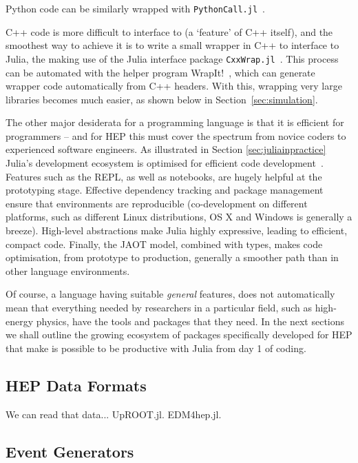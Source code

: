 \documentclass{webofc}
\begin{document}
Python code can be similarly wrapped with
\texttt{PythonCall.jl}~\cite{PythonCall.jl}.

C++ code is more difficult to interface to (a `feature' of C++ itself), and the
smoothest way to achieve it is to write a small wrapper in C++ to interface to
Julia, the making use of the Julia interface package
\texttt{CxxWrap.jl}~\cite{CxxWrap.jl}. This process can be automated with the
helper program WrapIt!~\cite{wrapit-github}, which can generate wrapper code
automatically from C++ headers. With this, wrapping very large libraries becomes
much easier, as shown below in Section~\ref{sec:simulation}.

The other major desiderata for a programming language is that it is efficient
for programmers -- and for HEP this must cover the spectrum from novice coders
to experienced software engineers. As illustrated in Section
\ref{sec:juliainpractice} Julia's development ecosystem is optimised for
efficient code development~\cite{perkel-julia-science}. Features such as the
REPL, as well as notebooks, are hugely helpful at the prototyping stage.
Effective dependency tracking and package management ensure that environments
are reproducible (co-development on different platforms, such as different Linux
distributions, OS X and Windows is generally a breeze). High-level abstractions
make Julia highly expressive, leading to efficient, compact code. Finally, the
JAOT model, combined with types, makes code optimisation, from prototype to
production, generally a smoother path than in other language environments.

Of course, a language having suitable \emph{general} features, does not
automatically mean that everything needed by researchers in a particular field,
such as high-energy physics, have the tools and packages that they need. In the
next sections we shall outline the growing ecosystem of packages specifically
developed for HEP that make is possible to be productive with Julia from day 1
of coding. 

\subsection{HEP Data Formats}

We can read that data... UpROOT.jl. EDM4hep.jl.

\subsection{Event Generators}
\end{document}

